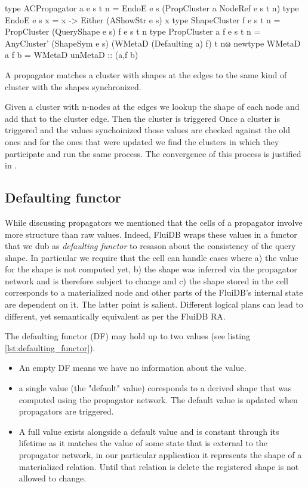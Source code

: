 \begin{code}
  \begin{haskellcode}
    type ACPropagator a e s t n =
      EndoE e s (PropCluster a NodeRef e s t n)
    type EndoE e s x = x -> Either (AShowStr e s) x
    type ShapeCluster f e s t n = PropCluster (QueryShape e s) f e s t n
    type PropCluster a f e s t n =
      AnyCluster' (ShapeSym e s) (WMetaD (Defaulting a) f) t nω
    newtype WMetaD a f b = WMetaD { unMetaD :: (a,f b)}
  \end{haskellcode}
  \caption{\label{lst:acpropagator}A propagator matches a cluster with
    shapes at the edges to the same kind of cluster with the shapes
    synchronized.}
\end{code}

Given a cluster with n-nodes at the edges we lookup the shape of each
node and add that to the cluster edge. Then the cluster is triggered
Once a cluster is triggered and the values synchoinized those values
are checked against the old ones and for the ones that were updated we
find the clusters in which they participate and run the same
process. The convergence of this process is justified in
\cite{kuperLVarsLatticebasedData2013}.


\subsection{Defaulting functor}

While discussing propagators we mentioned that the cells of a
propagator involve more structure than raw values. Indeed, FluiDB
wraps these values in a functor that we dub as \emph{defaulting
  functor} to resason about the consistency of the query shape. In
particular we require that the cell can handle cases where a) the
value for the shape is not computed yet, b) the shape was inferred via
the propagator network and is therefore subject to change and c) the
shape stored in the cell corresponds to a materialized node and other
parts of the FluiDB's internal state are dependent on it. The latter
point is salient. Different logical plans can lead to different, yet
semantically equivalent as per the FluiDB RA.

The defaulting functor (DF) may hold up to two values (see listing
\ref{lst:defaulting_functor}).

\begin{itemize}
\item An empty DF means we have no information about the value.
\item a single value (the "default" value) coresponds to a derived shape
  that was computed using the propagator network. The default value is
  updated when propagators are triggered.
\item A full value exists alongside a default value and is constant
  through its lifetime as it matches the value of some state that is
  external to the propagator network, in our particular application it
  represents the shape of a materialized relation. Until that relation
  is delete the registered shape is not allowed to change.
\end{itemize}

